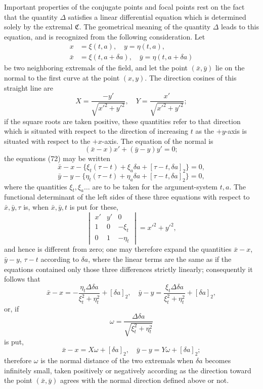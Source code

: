 \documentclass[11pt,a4paper,leqno]{article}
\begin{document}
Important properties of the conjugate points and focal points rest on the fact that the quantity $\Delta$ satisfies a linear differential equation which is determined solely by the extremal $\mathfrak{C}$. The geometrical meaning of the quantity $\Delta$ leads to this equation, and is recognized from the following consideration. Let
\begin{equation}\tag{72}
\begin{aligned}
x&=\xi(t,a),\quad y=\eta(t,a),\\
\bar x&=\xi(t,a+\delta a),\quad \bar y=\eta(t,a+\delta a)
\end{aligned}
\end{equation}
be two neighboring extremals of the field, and let the point $(\bar x,\bar y)$ lie on the normal to the first curve at the point $(x,y)$. The direction cosines of this straight line are
\[
X=\frac{-y'}{\sqrt{x'^2+y'^2}},\quad Y=\frac{x'}{\sqrt{x'^2+y'^2}};
\]
if the square roots are taken positive, these quantities refer to that direction which is situated with respect to the direction of increasing $t$ as the $+y$-axis is situated with respect to the $+x$-axis. The equation of the normal is
\[
(\bar x-x)x'+(\bar y-y)y'=0;
\]
the equations (72) may be written
\[
\bar x-x-\{\xi_t(\tau-t)+\xi_a\delta a+[\tau-t,\delta a]_2\}=0,
\]
\[
\bar y-y-\{\eta_t(\tau-t)+\eta_a\delta a+[\tau-t,\delta a]_2\}=0,
\]
where the quantities $\xi_t,\xi_a\ldots$ are to be taken for the argument-system $t,a$. The functional determinant of the left sides of these three equations with respect to $\bar x,\bar y,\tau$ is, when $\bar x,\bar y,t$ is put for these,
\[
\begin{vmatrix}
x'&y'&0\\
1&0&-\xi_t\\
0&1&-\eta_t
\end{vmatrix}=x'^2+y'^2,
\]
and hence is different from zero; one may therefore expand the quantities $\bar x-x$, $\bar y-y$, $\tau-t$ according to $\delta a$, where the linear terms are the same as if the equations contained only those three differences strictly linearly; consequently it follows that
\[
\bar x-x=-\frac{\eta_t\Delta\delta a}{\xi_t^2+\eta_t^2}+[\delta a]_2,\quad
\bar y-y=\frac{\xi_t\Delta\delta a}{\xi_t^2+\eta_t^2}+[\delta a]_2,
\]
or, if
\begin{equation}\tag{73}
\omega=\frac{\Delta\delta a}{\sqrt{\xi_t^2+\eta_t^2}}
\end{equation}
is put,
\[
\bar x-x=X\omega+[\delta a]_2,
\quad
\bar y-y=Y\omega+[\delta a]_2;
\]
therefore $\omega$ is the normal distance of the two extremals when $\delta a$ becomes infinitely small, taken positively or negatively according as the direction toward the point $(\bar x,\bar y)$ agrees with the normal direction defined above or not.
\end{document}

